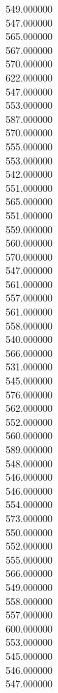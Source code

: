 549.000000\\
547.000000\\
565.000000\\
567.000000\\
570.000000\\
622.000000\\
547.000000\\
553.000000\\
587.000000\\
570.000000\\
555.000000\\
553.000000\\
542.000000\\
551.000000\\
565.000000\\
551.000000\\
559.000000\\
560.000000\\
570.000000\\
547.000000\\
561.000000\\
557.000000\\
561.000000\\
558.000000\\
540.000000\\
566.000000\\
531.000000\\
545.000000\\
576.000000\\
562.000000\\
552.000000\\
560.000000\\
589.000000\\
548.000000\\
546.000000\\
546.000000\\
554.000000\\
573.000000\\
550.000000\\
552.000000\\
555.000000\\
566.000000\\
549.000000\\
558.000000\\
557.000000\\
600.000000\\
553.000000\\
545.000000\\
546.000000\\
547.000000\\
